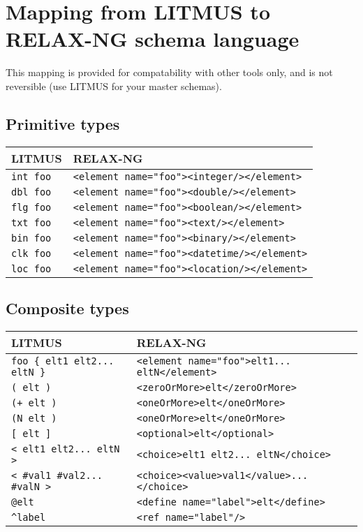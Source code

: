 \documentclass[12pt,a4paper,twoside]{article}
\renewcommand{\_}{\texttt{\symbol{95}}}
\begin{document}
\section{Mapping from LITMUS to RELAX-NG schema language}

This mapping is provided for compatability with other tools only, and is
not reversible (use LITMUS for your master schemas).

\subsection{Primitive types}

\begin{tabular}{l|l}
\hline
LITMUS \rule[-2mm]{0mm}{6.5mm} & RELAX-NG\\
\hline
\verb^int foo^ \rule[0mm]{0mm}{4.5mm} & \verb^<element name="foo"><integer/></element>^\\
\verb^dbl foo^ & \verb^<element name="foo"><double/></element>^\\
\verb^flg foo^ & \verb^<element name="foo"><boolean/></element>^\\
\verb^txt foo^ & \verb^<element name="foo"><text/></element>^\\
\verb^bin foo^ & \verb^<element name="foo"><binary/></element>^\\
\verb^clk foo^ & \verb^<element name="foo"><datetime/></element>^\\
\verb^loc foo^ \rule[-2mm]{0mm}{2mm} & \verb^<element name="foo"><location/></element>^\\
\hline
\end{tabular}

\subsection{Composite types}

\begin{tabular}{l|l}
\hline
LITMUS \rule[-2mm]{0mm}{6.5mm} & RELAX-NG\\
\hline
\verb^foo { elt1 elt2... eltN }^ \rule[0mm]{0mm}{4.5mm} &
	\verb^<element name="foo">elt1... eltN</element>^\\
\verb^( elt )^ & \verb^<zeroOrMore>elt</zeroOrMore>^\\
\verb^(+ elt )^ & \verb^<oneOrMore>elt</oneOrMore>^\\
\verb^(N elt )^ & \verb^<oneOrMore>elt</oneOrMore>^\\
\verb^[ elt ]^ & \verb^<optional>elt</optional>^\\
\verb^< elt1 elt2... eltN >^ & \verb^<choice>elt1 elt2... eltN</choice>^\\
\verb^< #val1 #val2... #valN >^ &
	\verb^<choice><value>val1</value>...</choice>^\\
\verb^@elt^ & \verb^<define name="label">elt</define>^\\
\verb~^label~ \rule[-2mm]{0mm}{2mm} & \verb^<ref name="label"/>^\\
\hline
\end{tabular}
\end{document}
